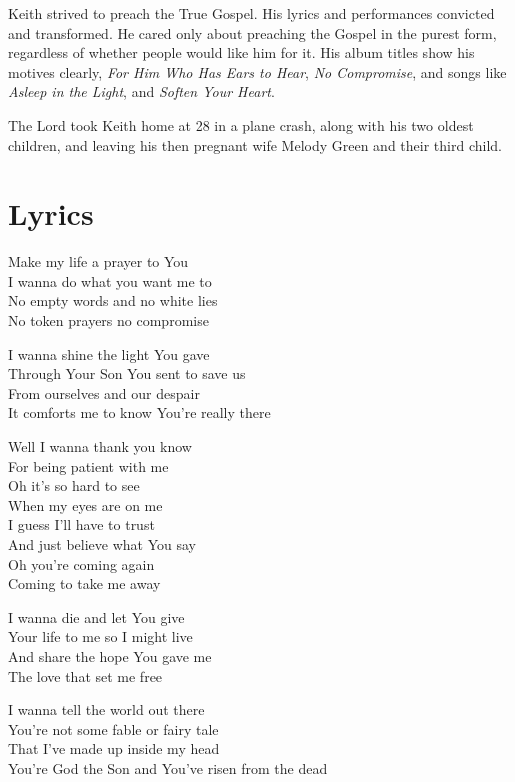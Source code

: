 \documentclass[10pt,a4paper,oneside,twocolumn]{book}
\begin{document}
Keith strived to preach the True Gospel. His lyrics and performances convicted and transformed. He cared only about preaching the Gospel in the purest form, regardless of whether people would like him for it. His album titles show his motives clearly, \textit{For Him Who Has Ears to Hear}, \textit{No Compromise}, and songs like \textit{Asleep in the Light}, and \textit{Soften Your Heart}.

The Lord took Keith home at 28 in a plane crash, along with his two oldest children, and leaving his then pregnant wife Melody Green and their third child.

\section{Lyrics}
\begin{flushleft}
Make my life a prayer to You\\
I wanna do what you want me to\\
No empty words and no white lies\\
No token prayers no compromise
\medskip 


I wanna shine the light You gave\\
Through Your Son You sent to save us\\
From ourselves and our despair\\
It comforts me to know You're really there
\medskip 

Well I wanna thank you know\\
For being patient with me\\
Oh it's so hard to see\\
When my eyes are on me\\
I guess I'll have to trust\\
And just believe what You say\\
Oh you're coming again\\
Coming to take me away
\medskip 

I wanna die and let You give\\
Your life to me so I might live\\
And share the hope You gave me\\
The love that set me free\\
\medskip 

I wanna tell the world out there\\
You're not some fable or fairy tale\\
That I've made up inside my head\\
You're God the Son and You've risen from the dead
\end{flushleft}
\end{document}
